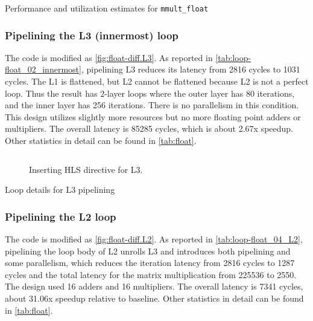 \begin{table}
    \centering
    \caption{Performance and utilization estimates for \texttt{mmult\_float}}\label{tab:float}
    
\end{table}

\subsubsection{Pipelining the L3 (innermost) loop}\label{sec:1bL3}

The code is modified as \autoref{fig:float-diff.L3}.
As reported in \autoref{tab:loop-float_02_innermost}, pipelining L3 reduces its latency from 2816 cycles to 1031 cycles.
The L1 is flattened, but L2 cannot be flattened because L2 is not a perfect loop.
Thus the result has 2-layer loops where the outer layer has 80 iterations, and the inner layer has 256 iterations.
There is no parallelism in this condition.
This design utilizes slightly more resources but no more floating point adders or multipliers.
The overall latency is 85285 cycles, which is about 2.67x speedup.
Other statistics in detail can be found in \autoref{tab:float}.

\begin{figure}[h!]
    \centering
    \inputminted{diff}{program/diff.L3}
    \caption{Inserting HLS directive for L3.}\label{fig:float-diff.L3}
\end{figure}

\begin{table}[h!]
    \caption{Loop details for L3 pipelining}
    \label{tab:loop-float_02_innermost}
    \centering
    
\end{table}

\subsubsection{Pipelining the L2 loop}\label{sec:1bL2}

The code is modified as \autoref{fig:float-diff.L2}.
As reported in \autoref{tab:loop-float_04_L2}, pipelining the loop body of L2 unrolls L3 and introduces both pipelining and some parallelism, which reduces the iteration latency from 2816 cycles to 1287 cycles and the total latency for the matrix multiplication from 225536 to 2550.
The design used 16 adders and 16 multipliers.
The overall latency is 7341 cycles, about 31.06x speedup relative to baseline.
Other statistics in detail can be found in \autoref{tab:float}.


